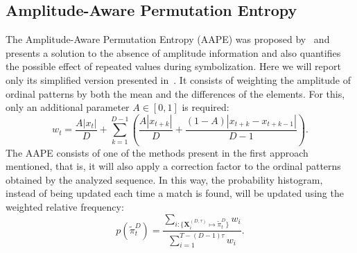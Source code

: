 \begin{center}
\end{center}

\subsection{Amplitude-Aware Permutation Entropy}\label{AAPE}

The Amplitude-Aware Permutation Entropy (AAPE) was proposed by~\cite{azami2016amplitude} and presents a solution to the absence of amplitude information and also quantifies the possible effect of repeated values during symbolization.
Here we will report only its simplified version presented in~\cite{cuesta2018classification}.
It consists of weighting the amplitude of ordinal patterns by both the mean and the differences of the elements.
For this, only an additional parameter $ A \in [0, 1]$ is required:
\begin{equation}
w_t = \frac{A  |x_t|}{D} + \sum_{k = 1}^{D - 1} \left(\frac{A  |x_{t + k}|}{D} + \frac{(1 - A)  |x_{t+k} - x_{t+k-1}|}{D - 1}\right).
\end{equation}
The AAPE consists of one of the methods present in the first approach mentioned, that is, it will also apply a correction factor to the ordinal patterns obtained by the analyzed sequence.
In this way, the probability histogram, instead of being updated each time a match is found, will be updated using the weighted relative frequency:
\begin{equation}
p(\widetilde \pi_t^D) = \frac{\sum_{i : \{\mathbf{X}^{(D,\tau)}_i \mapsto \widetilde\pi^D_t\}} w_{i}}{\sum_{i = 1}^{T-(D-1)\tau} w_{i}}.
\end{equation}

